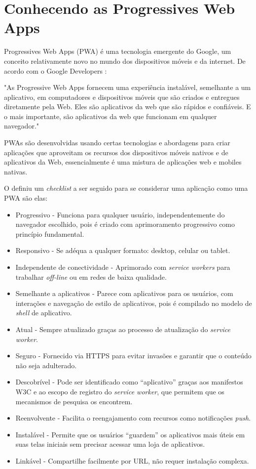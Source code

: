 \chapter{\Large{\textbf{Conhecendo as Progressives Web Apps}}}

Progressives Web Apps (PWA) é uma tecnologia emergente do Google, um conceito relativamente novo no mundo dos dispositivos móveis e da internet. De acordo com o Google Developers \cite{pwa}: \begin{citacao}
"As Progressive Web Apps fornecem uma experiência instalável, semelhante a um aplicativo, em computadores e dispositivos móveis que são criados e entregues diretamente pela Web. Eles são aplicativos da web que são rápidos e confiáveis. E o mais importante, são aplicativos da web que funcionam em qualquer navegador."
\end{citacao}

 \ac{PWA}s são desenvolvidas usando certas tecnologias e abordagens para criar aplicações que aproveitam os recursos dos dispositivos móveis nativos e de aplicativos da Web, essencialmente é uma mistura de aplicações web e mobiles nativas.

O \cite{pwa} definiu um \textit{checklist} a ser seguido para se considerar uma aplicação como uma \ac{PWA} são elas:

\begin{itemize}
	\item Progressivo - Funciona para qualquer usuário, independentemente do navegador escolhido, pois é criado com aprimoramento progressivo como princípio fundamental.
	\item Responsivo - Se adéqua a qualquer formato: desktop, celular ou tablet.
	\item Independente de conectividade - Aprimorado com \textit{service workers} para trabalhar \textit{off-line} ou em redes de baixa qualidade.
	\item Semelhante a aplicativos - Parece com aplicativos para os usuários, com interações e navegação de estilo de aplicativos, pois é compilado no modelo de \textit{shell} de aplicativo.
	\item Atual - Sempre atualizado graças ao processo de atualização do \textit{service worker}.
	\item Seguro - Fornecido via HTTPS para evitar invasões e garantir que o conteúdo não seja adulterado.
	\item Descobrível - Pode ser identificado como “aplicativo” graças aos manifestos W3C e ao escopo de registro do \textit{service worker}, que permitem que os mecanismos de pesquisa os encontrem.
	\item Reenvolvente - Facilita o reengajamento com recursos como notificações \textit{push}.
	\item Instalável - Permite que os usuários “guardem” os aplicativos mais úteis em suas telas iniciais sem precisar acessar uma loja de aplicativos.
	\item Linkável - Compartilhe facilmente por URL, não requer instalação complexa.
\end{itemize}

